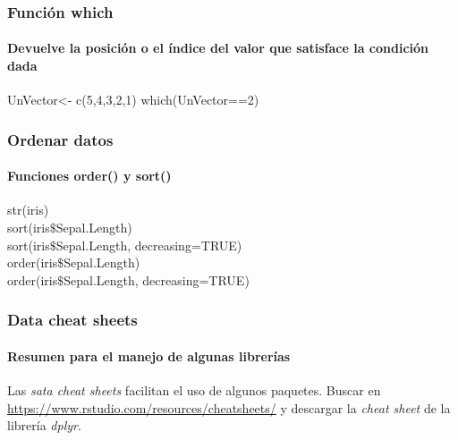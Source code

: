 \documentclass[12pt]{beamer}
\begin{document}
\begin{frame}
	\frametitle{Función which}
	\framesubtitle{Devuelve la posición o el índice del valor que satisface la condición dada}
	
	UnVector<- c(5,4,3,2,1)
	which(UnVector==2)
	
\end{frame}

\begin{frame}
	\frametitle{Ordenar datos}
	\framesubtitle{Funciones order() y sort()}
	str(iris)\\
	sort(iris$\$$Sepal.Length)\\
	sort(iris$\$$Sepal.Length, decreasing=TRUE)\\
	order(iris$\$$Sepal.Length)\\
	order(iris$\$$Sepal.Length, decreasing=TRUE)
	
\end{frame}

\begin{frame}
	\frametitle{Data cheat sheets}
	\framesubtitle{Resumen para el manejo de algunas librerías}
		
		Las \textit{sata cheat sheets} facilitan el uso de algunos  paquetes. Buscar en  \url{https://www.rstudio.com/resources/cheatsheets/} y descargar la \textit{cheat sheet} de la librería \textit{dplyr}.
	
\end{frame}
\end{document}
